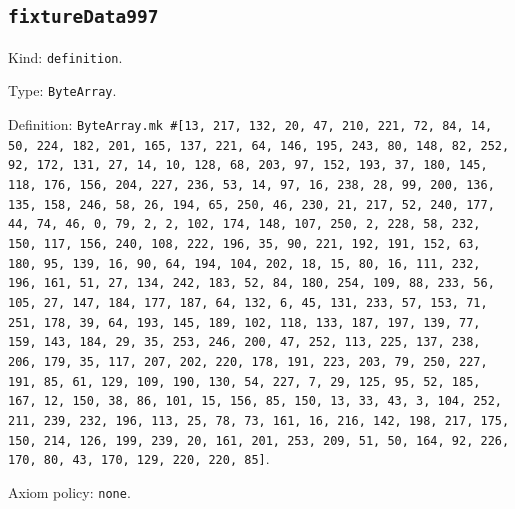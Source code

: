 \documentclass[11pt]{article}
\begin{document}
\subsection*{\texttt{fixtureData997}}
\noindent Kind: \texttt{definition}.\par
\noindent Type: \texttt{ByteArray}.\par
\noindent Definition: \texttt{ByteArray.mk \#[13, 217, 132, 20, 47, 210, 221, 72, 84, 14, 50, 224, 182, 201, 165, 137, 221, 64, 146, 195, 243, 80, 148, 82, 252, 92, 172, 131, 27, 14, 10, 128, 68, 203, 97, 152, 193, 37, 180, 145, 118, 176, 156, 204, 227, 236, 53, 14, 97, 16, 238, 28, 99, 200, 136, 135, 158, 246, 58, 26, 194, 65, 250, 46, 230, 21, 217, 52, 240, 177, 44, 74, 46, 0, 79, 2, 2, 102, 174, 148, 107, 250, 2, 228, 58, 232, 150, 117, 156, 240, 108, 222, 196, 35, 90, 221, 192, 191, 152, 63, 180, 95, 139, 16, 90, 64, 194, 104, 202, 18, 15, 80, 16, 111, 232, 196, 161, 51, 27, 134, 242, 183, 52, 84, 180, 254, 109, 88, 233, 56, 105, 27, 147, 184, 177, 187, 64, 132, 6, 45, 131, 233, 57, 153, 71, 251, 178, 39, 64, 193, 145, 189, 102, 118, 133, 187, 197, 139, 77, 159, 143, 184, 29, 35, 253, 246, 200, 47, 252, 113, 225, 137, 238, 206, 179, 35, 117, 207, 202, 220, 178, 191, 223, 203, 79, 250, 227, 191, 85, 61, 129, 109, 190, 130, 54, 227, 7, 29, 125, 95, 52, 185, 167, 12, 150, 38, 86, 101, 15, 156, 85, 150, 13, 33, 43, 3, 104, 252, 211, 239, 232, 196, 113, 25, 78, 73, 161, 16, 216, 142, 198, 217, 175, 150, 214, 126, 199, 239, 20, 161, 201, 253, 209, 51, 50, 164, 92, 226, 170, 80, 43, 170, 129, 220, 220, 85]}.\par
\noindent Axiom policy: \texttt{none}.\par
\end{document}
